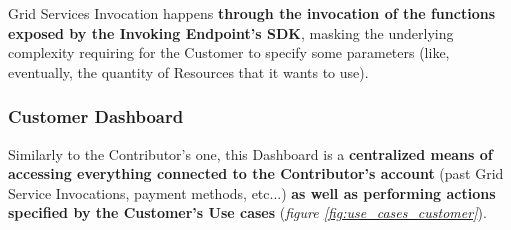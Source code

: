Grid Services Invocation happens \textbf{through the invocation of the functions exposed by the Invoking Endpoint's SDK}, masking the underlying complexity requiring for the Customer to specify some parameters (like, eventually, the quantity of Resources that it wants to use).

\subsubsection{Customer Dashboard}
Similarly to the Contributor's one, this Dashboard is a \textbf{centralized means of accessing everything connected to the Contributor's account} (past Grid Service Invocations, payment methods, etc...) \textbf{as well as performing actions specified by the Customer's Use cases} (\textit{figure \ref{fig:use_cases_customer}}).
